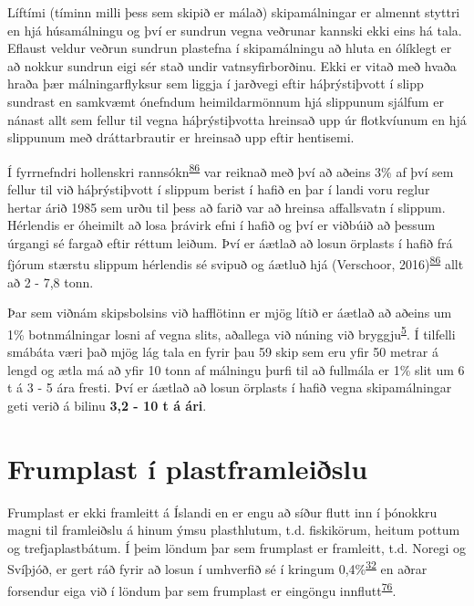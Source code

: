 \documentclass[icelandic,]{book}
\begin{document}
Líftími (tíminn milli þess sem skipið er málað) skipamálningar er almennt styttri en hjá húsamálningu og því er sundrun vegna veðrunar kannski ekki eins há tala. Eflaust veldur veðrun sundrun plastefna í skipamálningu að hluta en ólíklegt er að nokkur sundrun eigi sér stað undir vatnsyfirborðinu. Ekki er vitað með hvaða hraða þær málningarflyksur sem liggja í jarðvegi eftir háþrýstiþvott í slipp sundrast en samkvæmt ónefndum heimildarmönnum hjá slippunum sjálfum er nánast allt sem fellur til vegna háþrýstiþvotta hreinsað upp úr flotkvíunum en hjá slippunum með dráttarbrautir er hreinsað upp eftir hentisemi.

Í fyrrnefndri hollenskri rannsókn\textsuperscript{\protect\hyperlink{ref-Verschoor2016}{86}} var reiknað með því að aðeins 3\% af því sem fellur til við háþrýstiþvott í slippum berist í hafið en þar í landi voru reglur hertar árið 1985 sem urðu til þess að farið var að hreinsa affallsvatn í slippum. Hérlendis er óheimilt að losa þrávirk efni í hafið og því er viðbúið að þessum úrgangi sé fargað eftir réttum leiðum. Því er áætlað að losun örplasts í hafið frá fjórum stærstu slippum hérlendis sé svipuð og áætluð hjá (Verschoor, 2016)\textsuperscript{\protect\hyperlink{ref-Verschoor2016}{86}} allt að 2 - 7,8 tonn.

Þar sem viðnám skipsbolsins við hafflötinn er mjög lítið er áætlað að aðeins um 1\% botnmálningar losni af vegna slits, aðallega við núning við bryggju\textsuperscript{\protect\hyperlink{ref-OECD2009}{5}}. Í tilfelli smábáta væri það mjög lág tala en fyrir þau 59 skip sem eru yfir 50 metrar á lengd og ætla má að yfir 10 tonn af málningu þurfi til að fullmála er 1\% slit um 6 t á 3 - 5 ára fresti. Því er áætlað að losun örplasts í hafið vegna skipamálningar geti verið á bilinu \textbf{3,2 - 10 t á ári}.

\hypertarget{frumplast-i-plastframleislu}{%
\section*{Frumplast í plastframleiðslu}\label{frumplast-i-plastframleislu}}

Frumplast er ekki framleitt á Íslandi en er engu að síður flutt inn í þónokkru magni til framleiðslu á hinum ýmsu plasthlutum, t.d. fiskikörum, heitum pottum og trefjaplastbátum. Í þeim löndum þar sem frumplast er framleitt, t.d. Noregi og Svíþjóð, er gert ráð fyrir að losun í umhverfið sé í kringum 0,4\%\textsuperscript{\protect\hyperlink{ref-sundt2014sources}{32}} en aðrar forsendur eiga við í löndum þar sem frumplast er eingöngu innflutt\textsuperscript{\protect\hyperlink{ref-lassen2015microplastics}{76}}.
\end{document}
